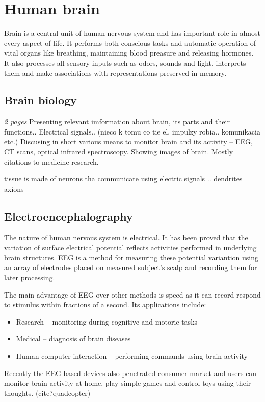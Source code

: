 \chapter{Human brain}
Brain is a central unit of human nervous system and has important role in almost
every aspect of life. It performs both conscious tasks and automatic operation
of vital organs like breathing, maintaining blood preasure and releasing
hormones. It also processes all sensory inputs such as odors, sounds and light,
interprets them and make associations with representations preserved in memory.
\section{Brain biology}
\emph{2 pages}
Presenting relevant imformation about brain, its parts and their functions..
Electrical signals..  (nieco k tomu co tie el. impulzy robia.. komunikacia etc.)
Discusing in short various means to monitor brain and its activity -- EEG, 
CT scans, optical infrared spectroscopy. Showing images of brain.
Mostly citations to medicine research.

tissue is made of neurons tha communicate using electric signals .. dendrites
axions 

\section{Electroencephalography}
The nature of human nervous system is electrical. It has been proved that the
variation of surface electrical potential reflects activities performed in
underlying brain structures. EEG is a method for measuring these potential
variantion using an array of electrodes placed on measured subject's scalp and
recording them for later processing.\cite{eegClass}

The main advantage of EEG over other methods is speed as it can record respond
to stimulus within fractions of a second.\cite{eegFund} Its applications include:
\begin{itemize}
  \item Research -- monitoring during cognitive and motoric tasks
  \item Medical -- diagnosis of brain diseases
  \item Human computer interaction -- performing commands using brain activity  
\end{itemize}
Recently the EEG based devices also penetrated consumer market and users can
monitor brain activity at home, play simple games and control toys using
their thoughts. (cite?quadcopter)

